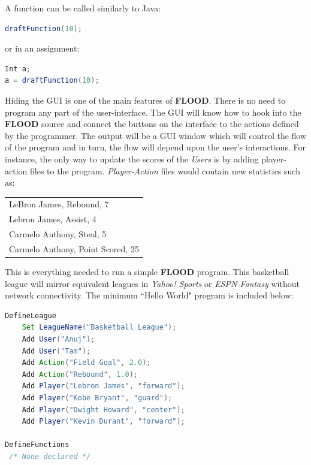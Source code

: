 \documentclass[12pt]{report}
\begin{document}
A function can be called similarly to Java:

\begin{singlespace}
\begin{lstlisting}[language=Java,label=some-code,caption={Function call.}]
draftFunction(10);
\end{lstlisting}
\end{singlespace}

or in an assignment:

\begin{singlespace}
\begin{lstlisting}[language=Java,label=some-code,caption={Function call in an assignment.}]
Int a;
a = draftFunction(10);
\end{lstlisting}
\end{singlespace}

Hiding the GUI is one of the main features of \textbf{FLOOD}. There is no need to program any part of the user-interface. The GUI will know how to hook into the \textbf{FLOOD} source and connect the buttons on the interface to the actions defined by the programmer. The output will be a GUI window which will control the flow of the program and in turn, the flow will depend upon the user's interactions. For instance, the only way to update the scores of the \textit{Users} is by adding player-action files to the program. \textit{Player-Action} files would contain new statistics such as:
\begin{center}
\begin{singlespace}
\begin{tabular}{ l }
LeBron James, Rebound, 7 \\
Lebron James, Assist, 4  \\
Carmelo Anthony, Steal, 5 \\
Carmelo Anthony, Point Scored, 25
\end{tabular}
\end{singlespace}
\end{center}

This is everything needed to run a simple \textbf{FLOOD} program. This basketball league will mirror equivalent leagues in \textit{Yahoo! Sports} or \textit{ESPN Fantasy} without network connectivity. The minimum ``Hello World" program is included below:

\begin{singlespace}
\begin{lstlisting}[language=Java,label=some-code,caption={Minimal FLOOD program to create a basektball fantasy league.}]
DefineLeague
	Set LeagueName("Basketball League");
	Add User("Anuj");
	Add User("Tam");
	Add Action("Field Goal", 2.0);
	Add Action("Rebound", 1.0);
	Add Player("Lebron James", "forward");
	Add Player("Kobe Bryant", "guard");
	Add Player("Dwight Howard", "center");
	Add Player("Kevin Durant", "forward");

DefineFunctions
 /* None declared */
\end{lstlisting}
\end{singlespace}
\end{document}
